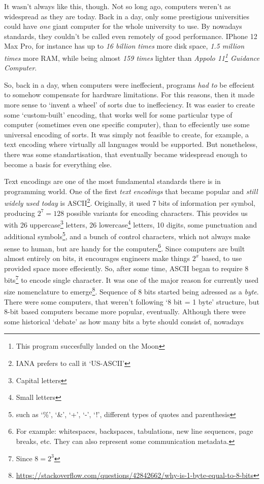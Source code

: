 \documentclass{article}
\begin{document}
            It wasn't always like this, though. Not so long ago, computers weren't as widespread as they are today. Back in a day, only some prestigious universities could have
            \emph{one} giant computer for the whole university to use. By nowadays standards, they couldn't be called even remotely of good performance. IPhone 12 Max Pro, for instance
            has up to \emph{16 billion times} more disk space, \emph{1.5 million times} more RAM, while being almost \emph{159 times} lighter than 
            \emph{Appolo 11\footnote{This program succesfully landed on the Moon} Guidance Computer}. \par

            So, back in a day, when computers were ineffecient, programs \emph{had to} be effecient to somehow compensate for hardware limitations. For this reasons, then it 
            made more sense to `invent a wheel' of sorts due to ineffeciency. It was easier to create some `custom-built' encoding, that works well for some particular type
            of computer (sometimes even one specific computer), than to effeciently use some universal encoding of sorts. It was simply not feasible to create, for example,
            a text encoding where virtually all languages would be supported. But nonetheless, there was some standartisation, that eventually became widespread enough to 
            become a basis for everything else. \par

            Text encodings are one of the most fundamental standards there is in programming world. One of the first \emph{text encodings} that became popular and \emph{still widely
            used today} is ASCII\footnote{IANA prefers to call it `US-ASCII'}. Originally, it used 7 bits of information per symbol, producing $2^7 = 128$ possible 
            variants for encoding characters. This provides us with 26 uppercase\footnote{Capital letters} letters, 26 lowercase\footnote{Small letters} letters, 10 digits, some punctuation
            and additional symbols\footnote{such as `\%', `\&', `+', `-', `!', different types of quotes and parenthesis}, and a bunch of control characters, which not always make sense to human,
            but are handy for the computers\footnote{For example: whitespaces, backspaces, tabulations, new line sequences, page breaks, etc. They can also represent some communication metadata.}.
            Since computers are built almost entirely on bits, it encourages engineers make things $2^x$ based, to use provided space more effeciently. So, after some time, ASCII
            began to require 8 bits\footnote{Since $8 = 2^3$} to encode single character. It was one of the major reason for currently used size nomenclature to 
            emerge\footnote{\href{https://stackoverflow.com/questions/42842662/why-is-1-byte-equal-to-8-bits}{https://stackoverflow.com/questions/42842662/why-is-1-byte-equal-to-8-bits}}.
            Sequence of 8 bits started being adressed as a \emph{byte}. There were some computers, that weren't following `8 bit = 1 byte' structure, but 8-bit based
            computers became more popular, eventually. Although there were some historical `debate' as how many bits a byte should consist of, nowadays 
            
\end{document}

